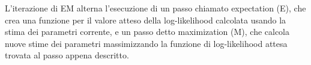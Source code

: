 \begin{info}[Algoritmo EM]
L'iterazione di EM alterna l'esecuzione di un passo chiamato expectation (E), che crea una funzione per il valore atteso della log-likelihood calcolata usando la stima dei parametri corrente, e un passo detto maximization (M), che calcola nuove stime dei parametri massimizzando la funzione di log-likelihood attesa trovata al passo appena descritto\cite{AlgoritmEM:online}.
\end{info}

\newpage